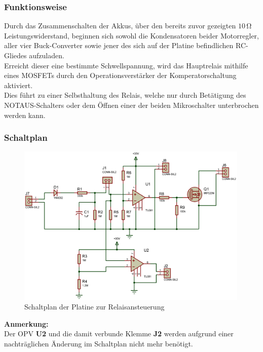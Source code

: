 \subsubsection{Funktionsweise}
Durch das Zusammenschalten der Akkus, über den bereits zuvor gezeigten $10\,\mathrm{\Omega}$ Leistungswiderstand, beginnen sich sowohl die Kondensatoren beider Motorregler, aller vier Buck-Converter sowie jener des sich auf der Platine befindlichen RC-Gliedes aufzuladen.\\
Erreicht dieser eine bestimmte Schwellspannung, wird das Hauptrelais mithilfe eines MOSFETs durch den Operationsverstärker der Komperatorschaltung aktiviert.\\
Dies führt zu einer Selbsthaltung des Relais, welche nur durch Betätigung des NOTAUS-Schalters oder dem Öffnen einer der beiden Mikroschalter unterbrochen werden kann.
\subsubsection{Schaltplan}
\begin{figure}[h]
    \centering
    \includegraphics[width=0.99\textwidth]{../Proteus/Exports/Relaisansteuerung.png}
    \caption{Schaltplan der Platine zur Relaisansteuerung}
\end{figure}
\textbf{Anmerkung:}\\
Der OPV \textbf{U2} und die damit verbunde Klemme \textbf{J2} werden aufgrund einer nachträglichen Änderung im Schaltplan nicht mehr benötigt.
\newpage
